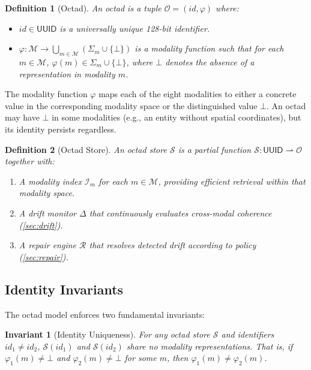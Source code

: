 \documentclass[11pt,twocolumn]{article}
\newtheorem{definition}{Definition}[section]
\newtheorem{invariant}{Invariant}[section]
\newcommand{\octad}{\mathcal{O}}
\newcommand{\modset}{\mathcal{M}}
\newcommand{\driftfn}{\Delta}
\newcommand{\repairfn}{\mathcal{R}}
\begin{document}
\begin{definition}[Octad]\label{def:octad}
An \emph{octad} is a tuple $\octad = (\mathit{id}, \varphi)$ where:
\begin{itemize}[leftmargin=*]
  \item $\mathit{id} \in \mathsf{UUID}$ is a universally unique 128-bit identifier.
  \item $\varphi : \modset \to \bigcup_{m \in \modset} (\Sigma_m \cup \{\bot\})$
    is a \emph{modality function} such that for each $m \in \modset$,
    $\varphi(m) \in \Sigma_m \cup \{\bot\}$, where $\bot$ denotes the absence
    of a representation in modality $m$.
\end{itemize}
\end{definition}

The modality function $\varphi$ maps each of the eight modalities to either a
concrete value in the corresponding modality space or the distinguished value
$\bot$.  An octad may have $\bot$ in some modalities (e.g., an entity without
spatial coordinates), but its identity persists regardless.

\begin{definition}[Octad Store]\label{def:store}
An \emph{octad store} $\mathcal{S}$ is a partial function
$\mathcal{S} : \mathsf{UUID} \rightharpoonup \octad$ together with:
\begin{enumerate}[leftmargin=*]
  \item A \emph{modality index} $\mathcal{I}_m$ for each $m \in \modset$,
    providing efficient retrieval within that modality space.
  \item A \emph{drift monitor} $\driftfn$ that continuously evaluates
    cross-modal coherence (\cref{sec:drift}).
  \item A \emph{repair engine} $\repairfn$ that resolves detected drift
    according to policy (\cref{sec:repair}).
\end{enumerate}
\end{definition}

\subsection{Identity Invariants}

The octad model enforces two fundamental invariants:

\begin{invariant}[Identity Uniqueness]\label{inv:unique}
For any octad store $\mathcal{S}$ and identifiers $\mathit{id}_1 \neq \mathit{id}_2$,
$\mathcal{S}(\mathit{id}_1)$ and $\mathcal{S}(\mathit{id}_2)$ share no modality
representations.  That is, if $\varphi_1(m) \neq \bot$ and $\varphi_2(m) \neq \bot$
for some $m$, then $\varphi_1(m) \neq \varphi_2(m)$.
\end{invariant}
\end{document}
